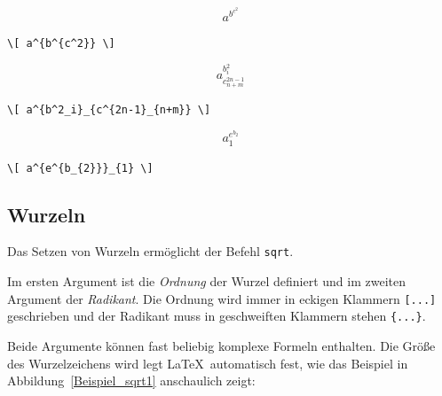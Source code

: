 \documentclass[a4paper,10pt,twoside]{scrbook}
\begin{document}
\begin{minipage}[c]{.4\textwidth}
\vspace*{-5mm}
\[ a^{b^{c^2}} \]
\end{minipage}
\hfill
\begin{minipage}[c]{.58\textwidth}
\setlength{\parskip}{1em}
\verb!\[ a^{b^{c^2}} \]!
\end{minipage}

\begin{minipage}[c]{.4\textwidth}
\vspace*{-5mm}
\[ a^{b^2_i}_{c^{2n-1}_{n+m}} \]
\end{minipage}
\hfill
\begin{minipage}[c]{.58\textwidth}
\setlength{\parskip}{1em}
\verb!\[ a^{b^2_i}_{c^{2n-1}_{n+m}} \]!
\end{minipage}

\begin{minipage}[c]{.4\textwidth}
\vspace*{-5mm}
\[ a^{e^{b_{2}}}_{1} \]
\end{minipage}
\hfill
\begin{minipage}[c]{.58\textwidth}
\setlength{\parskip}{1em}
\verb!\[ a^{e^{b_{2}}}_{1} \]!
\end{minipage}


\subsection{Wurzeln}


Das Setzen von Wurzeln ermöglicht der Befehl
\verb!sqrt!.



Im ersten Argument ist die \textsl{Ordnung} der Wurzel definiert und im 
zweiten Argument der \textsl{Radikant}. Die Ordnung wird immer in eckigen 
Klammern \verb![...]! geschrieben und der 
Radikant muss in geschweiften Klammern stehen \verb!{...}!.



Beide Argumente können fast beliebig komplexe 
Formeln enthalten. 
Die Größe des Wurzelzeichens wird
legt \LaTeX\ automatisch fest, wie das Beispiel in Abbildung~\ref{Beispiel_sqrt1} anschaulich zeigt:
\end{document}
